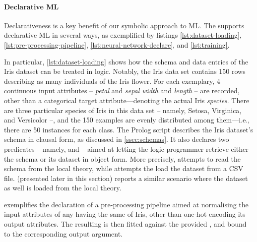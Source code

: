 \documentclass[runningheads]{llncs}
\begin{document}
\paragraph{Declarative ML}
%
Declarativeness is a key benefit of our symbolic approach to ML.
%
The \mllib{} supports declarative ML in several ways, as exemplified by listings \ref{lst:dataset-loading}, \ref{lst:pre-processing-pipeline}, \ref{lst:neural-network-declare}, and \ref{lst:training}.


In particular, \cref{lst:dataset-loading} shows how the schema and data entries of the Iris dataset can be treated in logic.
%
Notably, the Iris data set contains 150 rows describing as many individuals of the Iris flower.
%
For each exemplary, 4 continuous input attributes -- \emph{petal} and \emph{sepal width} and \emph{length} -- are recorded, other than a categorical target attribute---denoting the actual Iris \emph{species}.
%
There are three particular species of Iris in this data set -- namely, Setosa, Virginica, and Versicolor --, and the 150 examples are evenly distributed among them---i.e., there are 50 instances for each class.
%
The Prolog script describes the Iris dataset's schema in clausal form, as discussed in \cref{ssec:schemas}.
%
It also declares two predicates -- namely,  and  -- aimed at letting the logic programmer retrieve either the schema or its dataset in object form.
%
More precisely,  attempts to read the schema from the local theory, while  attempts the load the dataset from a CSV file.
%
 (presented later in this section) reports a similar scenario where the dataset as well is loaded from the local theory.

 exemplifies the declaration of a pre-processing pipeline aimed at normalising the input attributes of any  having the same  of Iris, other than one-hot encoding its output attributes.
%
The resulting  is then fitted against the provided , and bound to the corresponding output argument.
\end{document}
